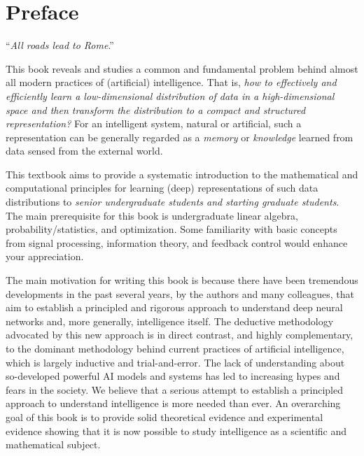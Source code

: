 \documentclass[../../book-main.tex]{subfiles}
\begin{document}
\chapter*{Preface}

\begin{center}
``{\em All roads lead to Rome}.''

\end{center}
\vspace{5mm}

This book reveals and studies a common and fundamental problem behind almost all modern practices of (artificial) intelligence. That is, {\em how to effectively and efficiently learn a low-dimensional distribution of data in a high-dimensional space and then transform the distribution to a compact and structured representation?} For an intelligent system, natural or artificial, such a representation can be generally regarded as a {\em memory} or {\em knowledge} learned from data sensed from the external world. 

This textbook aims to provide a systematic introduction to the mathematical and computational principles for learning (deep) representations of such data distributions to {\em senior undergraduate students and starting graduate students}. The main prerequisite for this book is undergraduate linear algebra, probability/statistics, and optimization. Some familiarity with basic concepts from signal processing, information theory, and feedback control would enhance your appreciation. 

The main motivation for writing this book is because there have been tremendous developments in the past several years, by the authors and many colleagues, that aim to establish a principled and rigorous approach to understand deep neural networks and, more generally, intelligence itself. The deductive methodology advocated by this new approach is in direct contrast, and highly complementary, to the dominant methodology behind current practices of artificial intelligence, which is largely inductive and trial-and-error. The lack of understanding about so-developed powerful AI models and systems has led to increasing hypes and fears in the society. We believe that a serious attempt to establish a principled approach to understand intelligence is more needed than ever. An overarching goal of this book is to provide solid theoretical evidence and experimental evidence showing that it is now possible to study intelligence as a scientific and mathematical subject. 
\end{document}
